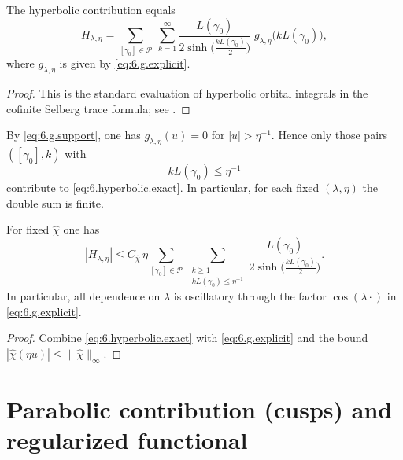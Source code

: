 \begin{lemma}\label{lem:6.hyperbolic.exact}
The hyperbolic contribution equals
\begin{equation}\label{eq:6.hyperbolic.exact}
H_{\lambda,\eta}
=\sum_{[\gamma_0]\in\mathcal P}\ \sum_{k=1}^{\infty}
\frac{L(\gamma_0)}{2\sinh\!\big(\tfrac{kL(\gamma_0)}{2}\big)}\;
g_{\lambda,\eta}\!\big(kL(\gamma_0)\big),
\end{equation}
where $g_{\lambda,\eta}$ is given by \eqref{eq:6.g.explicit}.
\end{lemma}

\begin{proof}
This is the standard evaluation of hyperbolic orbital integrals in the cofinite Selberg trace formula; see
\cite{Selberg1956,Hejhal1983}.
\end{proof}

\begin{corollary}\label{cor:6.length.cutoff}
By \eqref{eq:6.g.support}, one has $g_{\lambda,\eta}(u)=0$ for $|u|>\eta^{-1}$. Hence only those pairs
$([\gamma_0],k)$ with
\[
kL(\gamma_0)\le \eta^{-1}
\]
contribute to \eqref{eq:6.hyperbolic.exact}. In particular, for each fixed $(\lambda,\eta)$ the double sum is finite.
\end{corollary}

\begin{lemma}\label{lem:6.hyperbolic.bound}
For fixed $\widehat\chi$ one has
\begin{equation}\label{eq:6.hyperbolic.bound}
|H_{\lambda,\eta}|
\le C_{\widehat\chi}\,\eta
\sum_{[\gamma_0]\in\mathcal P}\ \sum_{\substack{k\ge1\\ kL(\gamma_0)\le \eta^{-1}}}
\frac{L(\gamma_0)}{2\sinh\!\big(\tfrac{kL(\gamma_0)}{2}\big)}.
\end{equation}
In particular, all dependence on $\lambda$ is oscillatory through the factor $\cos(\lambda\cdot)$ in \eqref{eq:6.g.explicit}.
\end{lemma}

\begin{proof}
Combine \eqref{eq:6.hyperbolic.exact} with \eqref{eq:6.g.explicit} and the bound
$|\widehat\chi(\eta u)|\le \|\widehat\chi\|_\infty$.
\end{proof}

\section{Parabolic contribution (cusps) and regularized functional}
\label{sec:ch6-parabolic}

